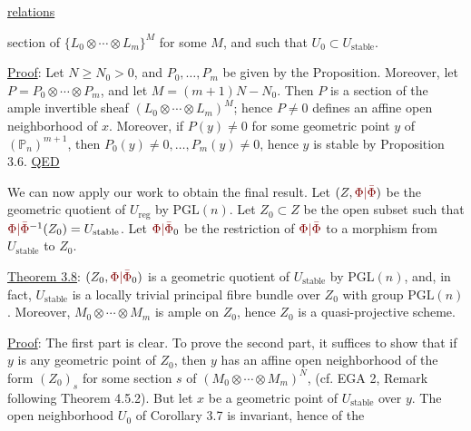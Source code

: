 
\uline{relations}


section of $\{L_0\otimes\cdots\otimes L_m\}^M$ for some $M$, and such that $U_0\subset U_{\mathrm{stable}}$.

\uline{Proof}: Let $N\geq N_0>0$, and $P_0,\ldots,P_m$ be given by the Proposition. Moreover, let $P=P_0\otimes\cdots\otimes P_m$, and let $M=(m+1)N-N_0$. Then $P$ is a section of the ample invertible sheaf $(L_0\otimes\cdots\otimes L_m)^M$; hence $P\ne0$ defines an affine open neighborhood of $x$. Moreover, if $P(y)\ne0$ for some geometric point $y$ of $(\mathbb{P}_n)^{m+1}$, then $P_0(y)\ne0,\ldots,P_m(y)\ne0$, hence $y$ is stable by Proposition 3.6.
\uline{QED}

We can now apply our work to obtain the final result. Let $(Z,\unsure{\Phi|\bar\Phi})$ be the geometric quotient of $U_{\mathrm{reg}}$ by $\mathrm{PGL}(n)$. Let $Z_0\subset Z$ be the open subset such that $\unsure{\Phi|\bar\Phi}^{-1}(Z_0)=U_{\mathrm{stable}}$. Let $\unsure{\Phi|\bar\Phi}_0$ be the restriction of $\unsure{\Phi|\bar\Phi}$ to a morphism from $U_{\mathrm{stable}}$ to $Z_0$.

\uline{Theorem 3.8}: $(Z_0,\unsure{\Phi|\bar\Phi}_0)$ is a geometric quotient of $U_{\mathrm{stable}}$ by $\mathrm{PGL}(n)$, and, in fact, $U_{\mathrm{stable}}$ is a locally trivial principal fibre bundle over $Z_0$ with group $\mathrm{PGL}(n)$. Moreover, $M_0\otimes\cdots\otimes M_m$ is ample on $Z_0$, hence $Z_0$ is a quasi-projective scheme.

\uline{Proof}: The first part is clear. To prove the second part, it suffices to show that if $y$ is any geometric point of $Z_0$, then $y$ has an affine open neighborhood of the form $(Z_0)_s$ for some section $s$ of $(M_0\otimes\cdots\otimes M_m)^N$, (cf. EGA 2, Remark following Theorem 4.5.2). But let $x$ be a geometric point of $U_{\mathrm{stable}}$ over $y$. The open neighborhood $U_0$ of Corollary 3.7 is invariant, hence of the

